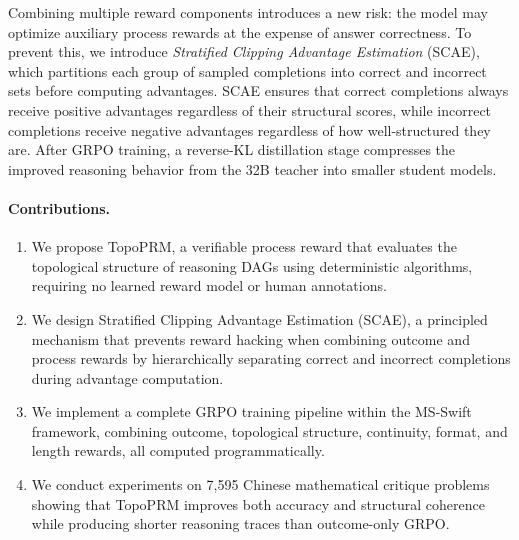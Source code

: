 Combining multiple reward components introduces a new risk: the model
may optimize auxiliary process rewards at the expense of answer
correctness. To prevent this, we introduce \emph{Stratified Clipping
Advantage Estimation} (SCAE), which partitions each group of sampled
completions into correct and incorrect sets before computing advantages.
SCAE ensures that correct completions always receive positive advantages
regardless of their structural scores, while incorrect completions
receive negative advantages regardless of how well-structured they are.
After GRPO training, a reverse-KL distillation stage compresses the
improved reasoning behavior from the 32B teacher into smaller student
models.

\paragraph{Contributions.}
\begin{enumerate}[leftmargin=*,itemsep=2pt]
    \item We propose TopoPRM, a verifiable process reward that evaluates
    the topological structure of reasoning DAGs using deterministic
    algorithms, requiring no learned reward model or human annotations.

    \item We design Stratified Clipping Advantage Estimation (SCAE), a
    principled mechanism that prevents reward hacking when combining
    outcome and process rewards by hierarchically separating correct and
    incorrect completions during advantage computation.

    \item We implement a complete GRPO training pipeline within the
    MS-Swift framework, combining outcome, topological structure,
    continuity, format, and length rewards, all computed programmatically.

    \item We conduct experiments on 7{,}595 Chinese mathematical critique
    problems showing that TopoPRM improves both accuracy and structural
    coherence while producing shorter reasoning traces than outcome-only
    GRPO.
\end{enumerate}
